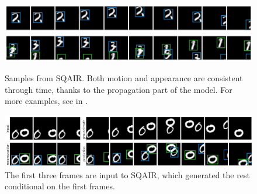 \begin{figure}
    \centering
    \includegraphics[width=\linewidth]{figures/SQAIR/mnist_samples/000102}
    \includegraphics[width=\linewidth]{figures/SQAIR/mnist_samples/000078}
    \caption{Samples from \gls{SQAIR}. Both motion and appearance are consistent through time, thanks to the propagation part of the model. For more examples, see  in .}
    \label{fig:mnist_samples}
\end{figure}
\begin{figure}
    \centering
    \includegraphics[width=\linewidth]{figures/SQAIR/sqair_mnist_conditional_after_three}
    \caption{The first three frames are input to \gls{SQAIR}, which generated  the rest conditional on the first frames.}
    \label{fig:mnist_cond_gen}
\end{figure}


